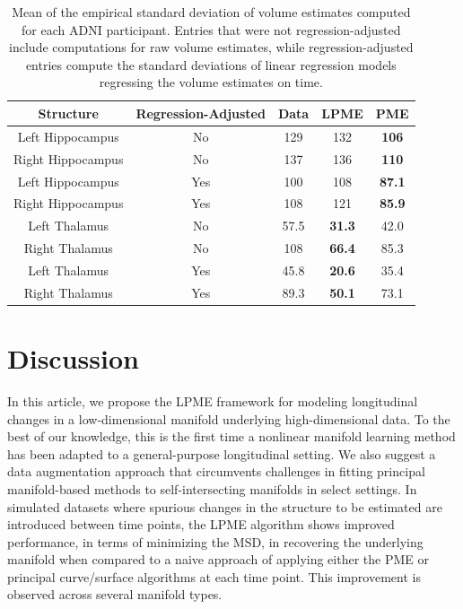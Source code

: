 \documentclass[12pt]{article}
\theoremstyle{definition}
\begin{document}
\begin{table}[ht]
  \centering
  \begin{tabular}{|c c c c c|}
    \hline
    Structure & Regression-Adjusted & Data & LPME & PME  \\
    \hline
    Left Hippocampus & No & 129 & 132 & \textbf{106} \\
    Right Hippocampus & No & 137 & 136 & \textbf{110} \\
    Left Hippocampus & Yes & 100 & 108 & \textbf{87.1} \\
    Right Hippocampus & Yes & 108 & 121 & \textbf{85.9} \\
    Left Thalamus & No & 57.5 & \textbf{31.3} & 42.0 \\
    Right Thalamus & No & 108 & \textbf{66.4} & 85.3 \\
    Left Thalamus & Yes & 45.8 & \textbf{20.6} & 35.4 \\
    Right Thalamus & Yes & 89.3 & \textbf{50.1} & 73.1 \\
    \hline
  \end{tabular}
  \caption{Mean of the empirical standard deviation of volume estimates computed for each ADNI participant. Entries that were not regression-adjusted include computations for raw volume estimates, while regression-adjusted entries compute the standard deviations of linear regression models regressing the volume estimates on time. }
  \label{table:adni_volume_sds}
\end{table}



\section{Discussion}\label{s:discussion}

In this article, we propose the LPME framework for modeling longitudinal changes in a low-dimensional manifold underlying high-dimensional data. To the best of our knowledge, this is the first time a nonlinear manifold learning method has been adapted to a general-purpose longitudinal setting. We also suggest a data augmentation approach that circumvents challenges in fitting principal manifold-based methods to self-intersecting manifolds in select settings. In simulated datasets where spurious changes in the structure to be estimated are introduced between time points, the LPME algorithm shows improved performance, in terms of minimizing the MSD, in recovering the underlying manifold when compared to a naive approach of applying either the PME or principal curve/surface algorithms at each time point. This improvement is observed across several manifold types.
\end{document}

